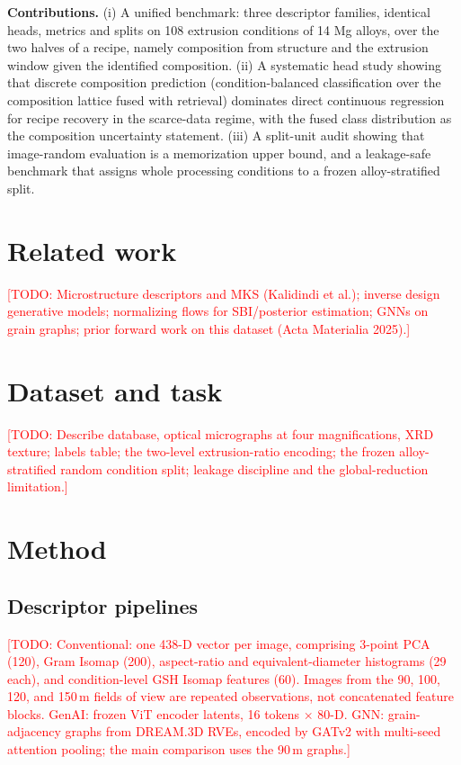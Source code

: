\documentclass{article}
\newcommand{\todo}[1]{\textcolor{red}{[TODO: #1]}}
\begin{document}
\textbf{Contributions.}
(i) A unified benchmark: three descriptor families, identical heads, metrics
and splits on 108 extrusion conditions of 14 Mg alloys, over the two halves of
a recipe, namely composition from structure and the extrusion window given the
identified composition.
(ii) A systematic head study showing that discrete composition prediction
(condition-balanced classification over the composition lattice fused with
retrieval) dominates direct continuous regression for recipe recovery in the
scarce-data regime, with the fused class distribution as the composition
uncertainty statement.
(iii) A split-unit audit showing that image-random evaluation is a memorization
upper bound, and a leakage-safe benchmark that assigns whole processing
conditions to a frozen alloy-stratified split.

\section{Related work}
\label{sec:related}
\todo{Microstructure descriptors and MKS (Kalidindi et al.); inverse design
generative models; normalizing flows for SBI/posterior estimation; GNNs on
grain graphs; prior forward work on this dataset (Acta Materialia 2025).}

\section{Dataset and task}
\label{sec:data}
\todo{Describe database, optical micrographs at four magnifications, XRD
texture; labels table; the two-level extrusion-ratio encoding; the frozen
alloy-stratified random condition split; leakage
discipline and the global-reduction limitation.}

\section{Method}
\label{sec:method}

\subsection{Descriptor pipelines}
\todo{Conventional: one 438-D vector per image, comprising 3-point PCA (120),
Gram Isomap (200), aspect-ratio and equivalent-diameter histograms (29 each),
and condition-level GSH Isomap features (60). Images from the 90, 100, 120,
and 150\,\textmu m fields of view are repeated observations, not concatenated
feature blocks. GenAI: frozen ViT encoder latents, 16 tokens $\times$ 80-D.
GNN: grain-adjacency graphs from DREAM.3D RVEs, encoded by GATv2 with
multi-seed attention pooling; the main comparison uses the 90\,\textmu m
graphs.}
\end{document}

